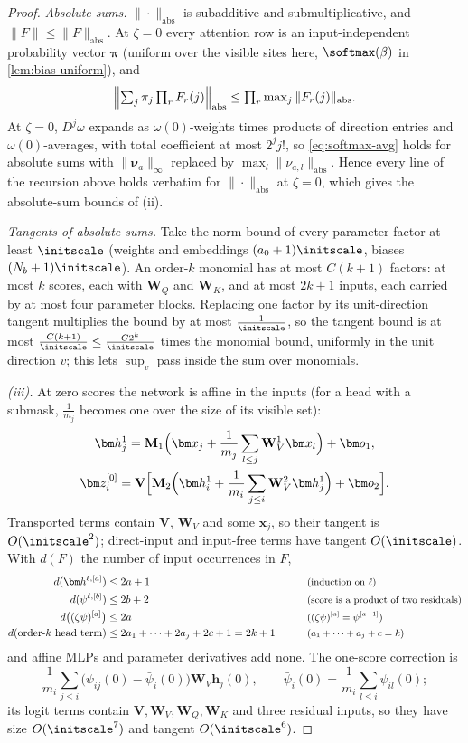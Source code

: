 \begin{proof}
\emph{Absolute sums.} $\|\cdot\|_{\mathrm{abs}}$ is subadditive and submultiplicative, and $\|F\|\le\|F\|_{\mathrm{abs}}$. At $\zeta=0$ every attention row is an
input-independent probability vector $\bm\pi$ (uniform over the visible sites here, $\softmax(\beta)$ in \cref{lem:bias-uniform}), and
\[
 \Bigl\|\textstyle\sum_j\pi_j\prod_rF_r(j)\Bigr\|_{\mathrm{abs}}\le\prod_r\max_j\|F_r(j)\|_{\mathrm{abs}} .
\]
At $\zeta=0$, $D^j\omega$ expands as $\omega(0)$-weights times products of direction entries and $\omega(0)$-averages, with total coefficient at most $2^jj!$,
so \cref{eq:softmax-avg} holds for absolute sums with $\|\bm\nu_a\|_\infty$ replaced by $\max_l\|\nu_{a,l}\|_{\mathrm{abs}}$. Hence every line of the recursion
above holds verbatim for $\|\cdot\|_{\mathrm{abs}}$ at $\zeta=0$, which gives the absolute-sum bounds of (ii).

\emph{Tangents of absolute sums.} Take the norm bound of every parameter factor at least $\initscale$ (weights and embeddings $(a_0+1)\initscale$,
biases $(N_b+1)\initscale$). An order-$k$ monomial has at most $C(k+1)$ factors: at most $k$ scores, each with $\mathbf W_Q$ and $\mathbf W_K$, and at
most $2k+1$ inputs, each carried by at most four parameter blocks. Replacing one factor by its unit-direction tangent multiplies the bound by at
most $\frac{1}{\initscale}$, so the tangent bound is at most $\frac{C(k+1)}{\initscale}\le\frac{C2^k}{\initscale}$ times the monomial bound, uniformly in the unit direction
$v$; this lets $\sup_v$ pass inside the sum over monomials.

\emph{(iii).} At zero scores the network is affine in the inputs (for a head with a submask, $\frac{1}{m_j}$ becomes one over the size of its
visible set):
\begin{gather*}
 \bm h^1_j=\mathbf M_1\Bigl(\bm x_j+\frac{1}{m_j}\sum_{l\le j}\mathbf W^1_V\bm x_l\Bigr)+\bm o_1,\\
 \bm z^{[0]}_i=\mathbf V\Bigl[\mathbf M_2\Bigl(\bm h^1_i+\frac{1}{m_i}\sum_{j\le i}\mathbf W^2_V\bm h^1_j\Bigr)+\bm o_2\Bigr].
\end{gather*}
Transported terms contain $\mathbf V$, $\mathbf W_V$ and some $\bm x_j$, so their tangent is $O(\initscale^2)$; direct-input and input-free terms have tangent $O(\initscale)$.
With $d(F)$ the number of input occurrences in $F$,
\begin{alignat*}{2}
 d(\bm h^{\ell,[a]})&\le2a+1 &\qquad& \why{induction on $\ell$}\\
 d(\psi^{\ell,[b]})&\le2b+2 && \why{score is a product of two residuals}\\
 d\bigl((\zeta\psi)^{[a]}\bigr)&\le2a && \why{$(\zeta\psi)^{[a]}=\psi^{[a-1]}$}\\
 d(\text{order-$k$ head term})&\le2a_1+\cdots+2a_j+2c+1=2k+1 && \why{$a_1+\cdots+a_j+c=k$}
\end{alignat*}
and affine MLPs and parameter derivatives add none. The one-score correction is
\[
 \frac{1}{m_i}\sum_{j\le i}\bigl(\psi_{ij}(0)-\bar\psi_i(0)\bigr)\mathbf W_V\bm h_j(0),\qquad \bar\psi_i(0)=\frac{1}{m_i}\sum_{l\le i}\psi_{il}(0);
\]
its logit terms contain $\mathbf V,\mathbf W_V,\mathbf W_Q,\mathbf W_K$ and three residual inputs, so they have size $O(\initscale^7)$ and tangent $O(\initscale^6)$.


\end{proof}
